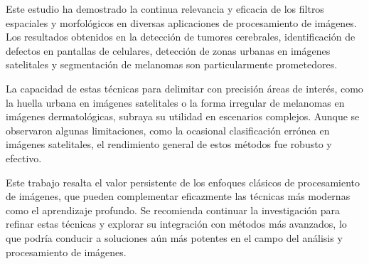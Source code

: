 Este estudio ha demostrado la continua relevancia y eficacia de los filtros espaciales y morfológicos en diversas aplicaciones de procesamiento de imágenes. Los resultados obtenidos en la detección de tumores cerebrales, identificación de defectos en pantallas de celulares, detección de zonas urbanas en imágenes satelitales y segmentación de melanomas son particularmente prometedores. 

La capacidad de estas técnicas para delimitar con precisión áreas de interés, como la huella urbana en imágenes satelitales o la forma irregular de melanomas en imágenes dermatológicas, subraya su utilidad en escenarios complejos. Aunque se observaron algunas limitaciones, como la ocasional clasificación errónea en imágenes satelitales, el rendimiento general de estos métodos fue robusto y efectivo. 

Este trabajo resalta el valor persistente de los enfoques clásicos de procesamiento de imágenes, que pueden complementar eficazmente las técnicas más modernas como el aprendizaje profundo. Se recomienda continuar la investigación para refinar estas técnicas y explorar su integración con métodos más avanzados, lo que podría conducir a soluciones aún más potentes en el campo del análisis y procesamiento de imágenes.






